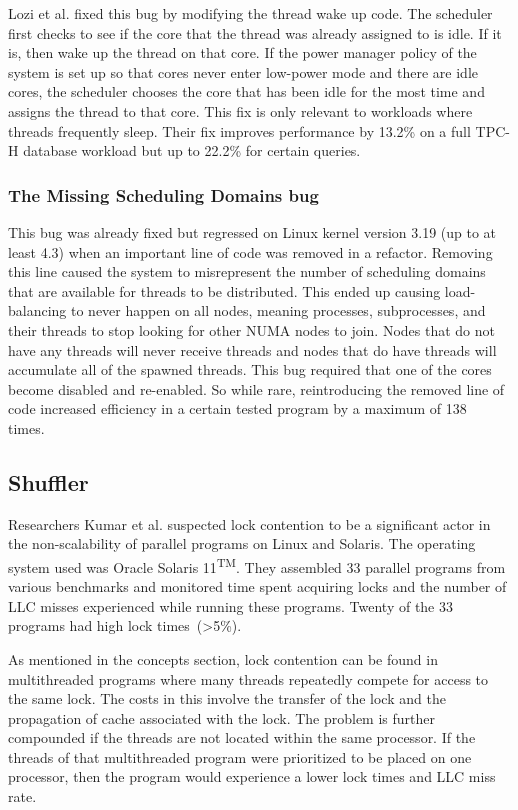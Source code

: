\documentclass{sig-alternate}
\begin{document}
Lozi et al. fixed this bug by modifying the thread wake up code. The scheduler first checks to see if the core that the thread was already assigned to is idle. If it is, then wake up the thread on that core. If the power manager policy of the system is set up so that cores never enter low-power mode and there are idle cores, the scheduler chooses the core that has been idle for the most time and assigns the thread to that core. This fix is only relevant to workloads where threads frequently sleep. Their fix improves performance by 13.2\% on a full TPC-H database workload but up to 22.2\% for certain queries.~\cite{Lozi:2016}

\subsubsection{The Missing Scheduling Domains bug}
\label{sec:cfsfault_missingsched}

This bug was already fixed but regressed on Linux kernel version 3.19 (up to at least 4.3) when an important line of code was removed in a refactor. Removing this line caused the system to misrepresent the number of scheduling domains that are available for threads to be distributed. This ended up causing load-balancing to never happen on all nodes, meaning processes, subprocesses, and their threads to stop looking for other NUMA nodes to join. Nodes that do not have any threads will never receive threads and nodes that do have threads will accumulate all of the spawned threads.
This bug required that one of the cores become disabled and re-enabled. So while rare, reintroducing the removed line of code increased efficiency in a certain tested program by a maximum of 138 times.~\cite{Lozi:2016}

\subsection{Shuffler}
\label{sec:shuffler}

Researchers Kumar et al. suspected lock contention to be a significant actor in the non-scalability of parallel programs on Linux and Solaris. The operating system used was Oracle Solaris 11\textsuperscript{TM}. They assembled 33 parallel programs from various benchmarks and monitored time spent acquiring locks and the number of LLC misses experienced while running these programs. Twenty of the 33 programs had high lock times~(>5\%).

As mentioned in the concepts section, lock contention can be found in multithreaded programs where many threads repeatedly compete for access to the same lock. The costs in this involve the transfer of the lock and the propagation of cache associated with the lock. The problem is further compounded if the threads are not located within the same processor. If the threads of that multithreaded program were prioritized to be placed on one processor, then the program would experience a lower lock times and LLC miss rate.
\end{document}

